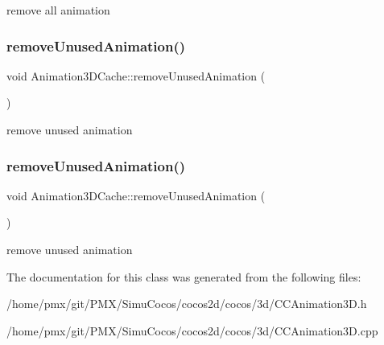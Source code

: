 remove all animation \mbox{\label{classAnimation3DCache_a1e0a94f429abffe1a904a77df8336532}} 
\subsubsection{\texorpdfstring{remove\+Unused\+Animation()}{removeUnusedAnimation()}\hspace{0.1cm}{\footnotesize\ttfamily [1/2]}}
{\footnotesize\ttfamily void Animation3\+D\+Cache\+::remove\+Unused\+Animation (\begin{DoxyParamCaption}{ }\end{DoxyParamCaption})}

remove unused animation \mbox{\label{classAnimation3DCache_a1e0a94f429abffe1a904a77df8336532}} 
\subsubsection{\texorpdfstring{remove\+Unused\+Animation()}{removeUnusedAnimation()}\hspace{0.1cm}{\footnotesize\ttfamily [2/2]}}
{\footnotesize\ttfamily void Animation3\+D\+Cache\+::remove\+Unused\+Animation (\begin{DoxyParamCaption}{ }\end{DoxyParamCaption})}

remove unused animation 

The documentation for this class was generated from the following files\+:\begin{DoxyCompactItemize}
\item 
/home/pmx/git/\+P\+M\+X/\+Simu\+Cocos/cocos2d/cocos/3d/C\+C\+Animation3\+D.\+h\item 
/home/pmx/git/\+P\+M\+X/\+Simu\+Cocos/cocos2d/cocos/3d/C\+C\+Animation3\+D.\+cpp\end{DoxyCompactItemize}
